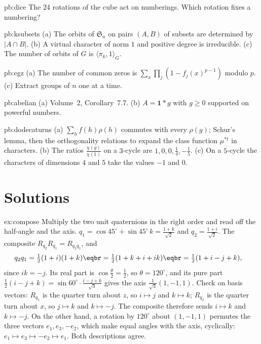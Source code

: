 \begin{hint}{pb:dice}
The $24$ rotations of the cube act on numberings. Which rotation fixes a numbering?
\end{hint}

\begin{hint}{pb:ksubsets}
(a) The orbits of $\mathfrak S_n$ on pairs $(A,B)$ of subsets are determined by $|A\cap B|$. (b) A virtual character of norm
$1$ and positive degree is irreducible. (c) The number of orbits of $G$ is $\langle\pi_k,1\rangle_G$.
\end{hint}

\begin{hint}{pb:egz}
(a) The number of common zeros is $\sum_x\prod_j(1-f_j(x)^{p-1})$ modulo $p$. (c) Extract groups of $n$ one at a time.
\end{hint}

\begin{hint}{pb:abelian}
(a) Volume~2, Corollary~7.7. (b) $A=\mathbf1*g$ with $g\ge0$ supported on powerful numbers.
\end{hint}

\begin{hint}{pb:dodecaturns}
(a) $\sum_hf(h)\rho(h)$ commutes with every $\rho(g)$; Schur's lemma, then the orthogonality relations to expand the class function $\mu^{*t}$ in
characters. (b) The ratios $\frac{\chi(g)}{\chi(1)}$ on a $3$-cycle are $1,0,0,\frac14,-\frac15$. (c) On a $5$-cycle the characters of dimensions $4$ and $5$ take the values
$-1$ and $0$.
\end{hint}

\section{Solutions}

\begin{solution}{ex:compose}
\idea Multiply the two unit quaternions in the right order and read off the half-angle and the axis.
\writeup $q_1=\cos45^\circ+\sin45^\circ\,k=\frac{1+k}{\sqrt2}$ and $q_2=\frac{1+i}{\sqrt2}$. The composite $R_{q_2}R_{q_1}=R_{q_2q_1}$, and
\[
\begin{aligned}q_2q_1&=\tfrac12(1+i)(1+k)\eqbr=\tfrac12(1+k+i+ik)\eqbr=\tfrac12(1+i-j+k),\end{aligned}
\]
since $ik=-j$. Its real part is $\cos\frac\theta2=\frac12$, so $\theta=120^\circ$, and its pure part $\frac12(i-j+k)=\sin60^\circ\cdot\frac{i-j+k}{\sqrt3}$ gives the axis $\frac1{\sqrt3}(1,-1,1)$. Check on basis vectors: $R_{q_1}$ is the quarter turn about $z$, so $i\mapsto j$ and $k\mapsto k$; $R_{q_2}$ is the quarter turn about $x$, so $j\mapsto k$ and $k\mapsto-j$. The composite therefore sends $i\mapsto k$ and $k\mapsto-j$. On the other hand, a rotation by $120^\circ$ about $(1,-1,1)$ permutes the three vectors $e_1,e_3,-e_2$, which make equal angles with the axis, cyclically: $e_1\mapsto e_3\mapsto-e_2\mapsto e_1$. Both descriptions agree.
\end{solution}

